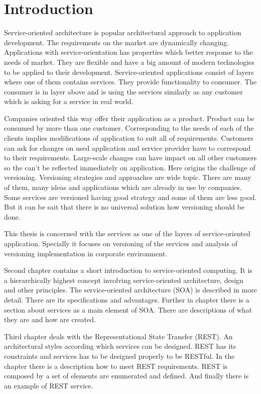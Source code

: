 \chapter{Introduction}
\label{chap:introduction}

Service-oriented architecture is popular architectural approach to application development. The requirements on the market are dynamically changing. Applications with service-orientation has properties which better response to the needs of market. They are flexible and have a big amount of modern technologies to be applied to their development. Service-oriented applications consist of layers where one of them contains services. They provide functionality to consumer. The consumer is in layer above and is using the services similarly as any customer which is asking for a service in real world.

Companies oriented this way offer their application as a product. Product can be consumed by more than one customer. Corresponding to the needs of each of the clients implies modifications of application to suit all of requirements. Customers can ask for changes on used application and service provider have to correspond to their requirements. Large-scale changes can have impact on all other customers so the can't be reflected immediately on application. Here origins the challenge of versioning. Versioning strategies and approaches are wide topic. There are many of them, many ideas and applications which are already in use by companies. Some services are versioned having good strategy and some of them are less good. But it can be sait that there is no universal solution how versioning should be done. 

\bigskip

This thesis is concerned with the services as one of the layers of service-oriented application. Specially it focuses on versioning of the services and analysis of versioning implementation in corporate environment. 

Second chapter contains a short introduction to service-oriented computing. It is a hierarchically highest concept involving service-oriented architecture, design and other principles. The service-oriented architecture (SOA) is described in more detail. There are its specifications and advantages. Further in chapter there is a section about services as a main element of SOA. There are descriptions of what they are and how are created.

Third chapter deals with the Representational State Transfer (REST). An architectural styles according which services can be designed. REST has its constraints and services has to be designed properly to be RESTful. In the chapter there is a description how to meet REST requirements. REST is composed by a set of elements are enumerated and defined. And finally there is an example of REST service.

